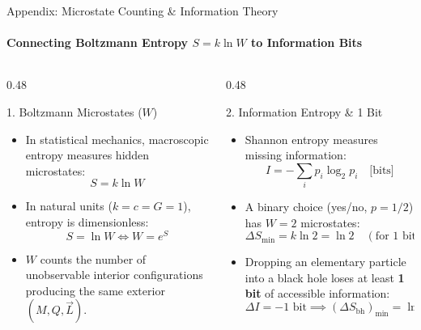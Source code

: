 \documentclass[aspectratio=169]{beamer}
\begin{document}
\begin{frame}{Appendix: Microstate Counting \& Information Theory}
\framesubtitle{Connecting Boltzmann Entropy $S = k \ln W$ to Information Bits}

\begin{columns}[T]
  \begin{column}{0.48\textwidth}
    \begin{block}{1. Boltzmann Microstates ($W$)}
    \begin{itemize}
      \item In statistical mechanics, macroscopic entropy measures hidden microstates:
      \vspace{-0.3cm}
      \[
        S = k \ln W
      \]
      \vspace{-0.7cm}
      \item In natural units ($k = c = G = 1$), entropy is dimensionless:
      \vspace{-0.3cm}
      \[
        S = \ln W \iff W = e^S
      \]
      \vspace{-0.7cm}
      \item $W$ counts the number of unobservable interior configurations producing the same exterior $(M, Q, \vec{L})$.
    \end{itemize}
    \end{block}
  \end{column}

  \begin{column}{0.48\textwidth}
    \begin{block}{2. Information Entropy \& 1 Bit}
    \begin{itemize}
      \item Shannon entropy measures missing information:
      \vspace{-0.5cm}
      \[
        I = -\sum_i p_i \log_2 p_i \quad \text{[bits]}
      \]
      \vspace{-0.5cm}
      \item A binary choice (yes/no, $p = 1/2$) has $W = 2$ microstates:
      \vspace{-0.3cm}
      \[
        \Delta S_{\text{min}} = k \ln 2 = \ln 2 \quad (\text{for } 1\text{ bit})
      \]
      \vspace{-0.7cm}
      \item Dropping an elementary particle into a black hole loses at least \textbf{1 bit} of accessible information:
      \vspace{-0.5cm}
      \[
        \Delta I = -1 \text{ bit} \implies (\Delta S_{\text{bh}})_{\text{min}} = \ln 2
      \]
    \end{itemize}
    \end{block}
  \end{column}
\end{columns}
\end{frame}
\end{document}
